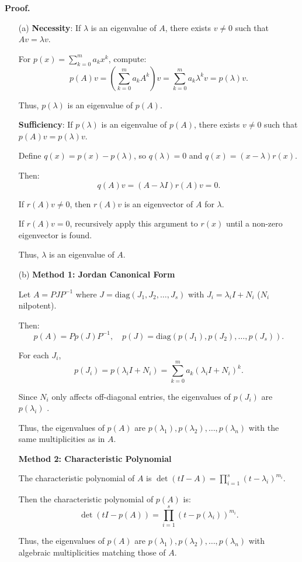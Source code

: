 \documentclass[a4paper, 11pt]{article}
\newenvironment{solution}
    {\textbf{Proof.}}
    {}
\begin{document}
\begin{solution}
	\begin{enumerate}
	\item[(a)]
	\textbf{Necessity}: If \(\lambda\) is an eigenvalue of \(A\), there exists \(v \neq 0\) such that \(Av = \lambda v\). 
	
	For \(p(x) = \sum_{k=0}^m a_k x^k\), compute:
	$$
	p(A)v = \left( \sum_{k=0}^m a_k A^k \right) v = \sum_{k=0}^m a_k \lambda^k v = p(\lambda) v.
	$$
	
	Thus, \(p(\lambda)\) is an eigenvalue of \(p(A)\).
	
	\textbf{Sufficiency}: If \(p(\lambda)\) is an eigenvalue of \(p(A)\), there exists \(v \neq 0\) such that \(p(A)v = p(\lambda)v\). 
	
	Define \(q(x) = p(x) - p(\lambda)\), so \(q(\lambda) = 0\) and \(q(x) = (x - \lambda)r(x)\). 
	
	Then:
	$$
	q(A)v = (A - \lambda I)r(A)v = 0.
	$$
	
	If \(r(A)v \neq 0\), then \(r(A)v\) is an eigenvector of \(A\) for \(\lambda\). 
	
	If \(r(A)v = 0\), recursively apply this argument to \(r(x)\) until a non-zero eigenvector is found.
	
	 Thus, \(\lambda\) is an eigenvalue of \(A\).
	 
	 \item[(b)]
	 	\textbf{Method 1: Jordan Canonical Form}
	
	 Let \(A = PJP^{-1}\) where \(J = \text{diag}(J_1, J_2, \ldots, J_s)\) with \(J_i = \lambda_i I + N_i\) (\(N_i\) nilpotent). 
	 
	 Then:
	 $$
	 p(A) = P p(J) P^{-1}, \quad p(J) = \text{diag}(p(J_1), p(J_2), \ldots, p(J_s)).
	 $$
	 
	 For each \(J_i\),
	 $$
	 p(J_i) = p(\lambda_i I + N_i) = \sum_{k=0}^m a_k (\lambda_i I + N_i)^k.
	 $$
	 
	 Since \(N_i\) only affects off-diagonal entries, the eigenvalues of \(p(J_i)\) are \(p(\lambda_i)\) . 
	 
	 Thus, the eigenvalues of \(p(A)\) are \(p(\lambda_1), p(\lambda_2), \ldots, p(\lambda_n)\) with the same multiplicities as in \(A\).
	 
	 \textbf{Method 2: Characteristic Polynomial}
	 
	 The characteristic polynomial of \(A\) is \(\det(tI - A) = \prod_{i=1}^s (t - \lambda_i)^{m_i}\).
	 
	 Then the characteristic polynomial of \(p(A)\) is:
	 $$
	 \det(tI - p(A)) = \prod_{i=1}^s (t - p(\lambda_i))^{m_i}.
	 $$
	 
	 Thus, the eigenvalues of \(p(A)\) are \(p(\lambda_1), p(\lambda_2), \ldots, p(\lambda_n)\) with algebraic multiplicities matching those of \(A\).
	  \end{enumerate}
\end{solution}
\end{document}
